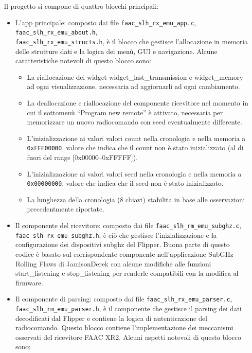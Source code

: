 Il progetto si compone di quattro blocchi principali:
\begin{itemize}
  \item L’app principale: composto dai file \texttt{faac\_slh\_rx\_emu\_app.c}, \texttt{faac\_slh\_rx\_emu\_about.h},\\\texttt{faac\_slh\_rx\_emu\_structs.h}, è il blocco che gestisce l’allocazione in memoria delle strutture dati e la logica dei menù, GUI e navigazione. Alcune caratteristiche notevoli di questo blocco sono:
  \begin{itemize}
    \item La riallocazione dei widget widget\_last\_transmission e widget\_memory ad ogni visualizzazione, necessaria ad aggiornarli ad ogni cambiamento.
    \item La deallocazione e riallocazione del componente ricevitore nel momento in cui il sottomenù “Program new remote” è attivato, necessaria per memorizzare un nuovo radiocomando con seed eventualmente differente.
    \item L’inizializzazione ai valori valori count nella cronologia e nella memoria a \texttt{0xFFF00000}, valore che indica che il count non è stato inizializzato (al di fuori del range [0x00000--0xFFFFF]).
    \item L’inizializzazione ai valori valori seed nella cronologia e nella memoria a \texttt{0x00000000}, valore che indica che il seed non è stato inizializzato.
    \item La lunghezza della cronologia (8 chiavi) stabilita in base alle osservazioni precedentmente riportate.
  \end{itemize}
  \item Il componente del ricevitore: composto dai file \texttt{faac\_slh\_rm\_emu\_subghz.c},\\\texttt{faac\_slh\_rx\_emu\_subghz.h}, è ciò che gestisce l’inizializzazione e la configurazione dei dispositivi subghz del Flipper. Buona parte di questo codice è basato sul corrispondente componente nell’applicazione SubGHz Rolling Flaws di JamisonDerek \cite{rolling_flaws} con alcune modifiche alle funzioni start\_listening e stop\_listening per renderle compatibili con la modifica al firmware.
  \item Il componente di parsing: composto dai file \texttt{faac\_slh\_rx\_emu\_parser.c},\\\texttt{faac\_slh\_rm\_emu\_parser.h}, è il componente che gestisce il parsing dei dati decodificati dal Flipper e contiene la logica di autenticazione del radiocomando. Questo blocco contiene l’implementazione dei meccanismi osservati del ricevitore FAAC XR2. Alcuni aspetti notevoli di questo blocco sono:

\end{itemize}
